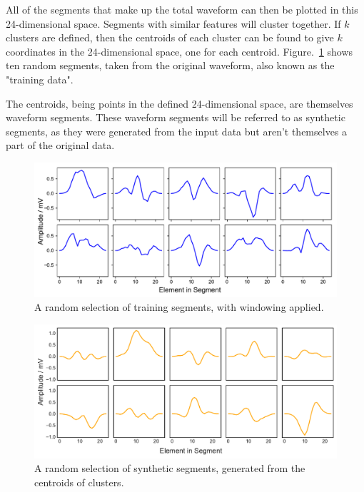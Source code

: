 All of the segments that make up the total waveform can then be plotted in this 24-dimensional space. Segments with similar features will cluster together. If $k$ clusters are defined, then the centroids of each cluster can be found to give $k$ coordinates in the 24-dimensional space, one for each centroid. Figure.~\ref{fig:kmeans_training} shows ten random segments, taken from the original waveform, also known as the "training data".

The centroids, being points in the defined 24-dimensional space, are themselves waveform segments. These waveform segments will be referred to as synthetic segments, as they were generated from the input data but aren't themselves a part of the original data. 

\begin{figure}[t]
    \includegraphics[width=1.0\textwidth]{fig/kmeans_training.pdf}
    \caption[K-means training segments]{A random selection of training segments, with windowing applied.}
    \label{fig:kmeans_training}
\end{figure}

\begin{figure}[t]
    \includegraphics[width=1.0\textwidth]{fig/kmeans_synthetic.pdf}
    \caption[K-means synthetic segments]{A random selection of synthetic segments, generated from the centroids of clusters.}
    \label{fig:kmeans_synthetic}
\end{figure}

